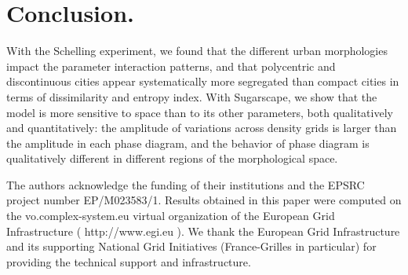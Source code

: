 \documentclass[Royal,sageh,times]{sagej}
\begin{document}
%
%
%
%
%
%



\section{Conclusion.}

With the Schelling experiment, we found that the different urban morphologies impact the parameter interaction patterns, and that polycentric and discontinuous cities appear systematically more segregated than compact cities in terms of dissimilarity and entropy index. With Sugarscape, we show that the model is more sensitive to space than to its other parameters, both qualitatively and quantitatively: the amplitude of variations across density grids is larger than the amplitude in each phase diagram, and the behavior of phase diagram is qualitatively different in different regions of the morphological space.

\begin{acks}
The authors acknowledge the funding of their institutions and the EPSRC project number EP/M023583/1. Results obtained in this paper were computed on the vo.complex-system.eu virtual organization of the European Grid Infrastructure ( http://www.egi.eu ). We thank the European Grid Infrastructure and its supporting National Grid Initiatives (France-Grilles in particular) for providing the technical support and infrastructure.
\end{acks}








\end{document}
